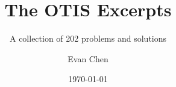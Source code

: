 \documentclass[paper=6.125in:9.25in,twoside,openright,pagesize=pdftex,10pt]{scrbook}
\title{The OTIS Excerpts}
\subtitle{A collection of 202 problems and solutions}
\author{Evan Chen}
\date{\today}
\begin{document}
\maketitle

\frontmatter




\mainmatter
\tableofcontents


\backmatter
\renewcommand{\listtheoremname}{List of problems and examples}
\renewcommand\indexname{Index of named problems}

\listoftheorems[ignoreall,show={problem,example}]
\printindex
\printbibliography

\end{document}

